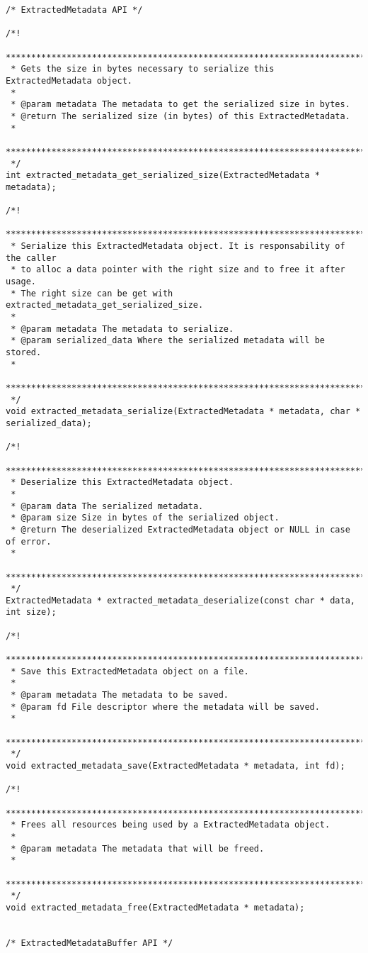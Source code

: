 \begin{lstlisting}
/* ExtractedMetadata API */

/*!
 *******************************************************************************
 * Gets the size in bytes necessary to serialize this ExtractedMetadata object.
 *
 * @param metadata The metadata to get the serialized size in bytes.
 * @return The serialized size (in bytes) of this ExtractedMetadata.
 *
 *******************************************************************************
 */
int extracted_metadata_get_serialized_size(ExtractedMetadata * metadata);

/*!
 *******************************************************************************
 * Serialize this ExtractedMetadata object. It is responsability of the caller
 * to alloc a data pointer with the right size and to free it after usage.
 * The right size can be get with extracted_metadata_get_serialized_size.
 *
 * @param metadata The metadata to serialize.
 * @param serialized_data Where the serialized metadata will be stored.
 *
 *******************************************************************************
 */
void extracted_metadata_serialize(ExtractedMetadata * metadata, char * serialized_data);

/*!
 *******************************************************************************
 * Deserialize this ExtractedMetadata object. 
 *
 * @param data The serialized metadata.
 * @param size Size in bytes of the serialized object.
 * @return The deserialized ExtractedMetadata object or NULL in case of error.
 *
 *******************************************************************************
 */
ExtractedMetadata * extracted_metadata_deserialize(const char * data, int size);

/*!
 *******************************************************************************
 * Save this ExtractedMetadata object on a file. 
 *
 * @param metadata The metadata to be saved.
 * @param fd File descriptor where the metadata will be saved.
 *
 *******************************************************************************
 */
void extracted_metadata_save(ExtractedMetadata * metadata, int fd);

/*!
 *******************************************************************************
 * Frees all resources being used by a ExtractedMetadata object.
 *
 * @param metadata The metadata that will be freed.
 *
 *******************************************************************************
 */
void extracted_metadata_free(ExtractedMetadata * metadata);


/* ExtractedMetadataBuffer API */


\end{lstlisting}

